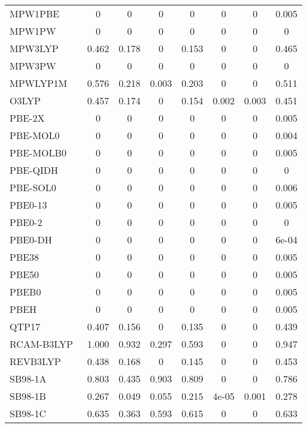 \begin{table*}
\begin{tabular}{|l|c|c|c|c|c|c|c|}
MPW1PBE~\cite{Adamo1998_664} & 0 & 0 & 0 & 0 & 0 & 0 & 0.005 \\
MPW1PW~\cite{Adamo1998_664} & 0 & 0 & 0 & 0 & 0 & 0 & 0 \\
MPW3LYP~\cite{Zhao2004_6908} & 0.462 & 0.178 & 0 & 0.153 & 0 & 0 & 0.465 \\
MPW3PW~\cite{Adamo1998_664} & 0 & 0 & 0 & 0 & 0 & 0 & 0 \\
MPWLYP1M~\cite{Schultz2005_11127} & 0.576 & 0.218 & 0.003 & 0.203 & 0 & 0 & 0.511 \\
O3LYP~\cite{Hoe2001_319,Cohen2001_607} & 0.457 & 0.174 & 0 & 0.154 & 0.002 & 0.003 & 0.451 \\
PBE-2X~\cite{Tahchieva2018_4806} & 0 & 0 & 0 & 0 & 0 & 0 & 0.005 \\
PBE-MOL0~\cite{delCampo2012_104108} & 0 & 0 & 0 & 0 & 0 & 0 & 0.004 \\
PBE-MOLB0~\cite{delCampo2012_104108} & 0 & 0 & 0 & 0 & 0 & 0 & 0.005 \\
PBE-QIDH~\cite{Bremond2014_031101} & 0 & 0 & 0 & 0 & 0 & 0 & 0 \\
PBE-SOL0~\cite{delCampo2012_104108} & 0 & 0 & 0 & 0 & 0 & 0 & 0.006 \\
PBE0-13~\cite{Cortona2012_086101} & 0 & 0 & 0 & 0 & 0 & 0 & 0.005 \\
PBE0-2~\cite{Chai2012_121} & 0 & 0 & 0 & 0 & 0 & 0 & 0 \\
PBE0-DH~\cite{Bremond2011_024106} & 0 & 0 & 0 & 0 & 0 & 0 & 6e-04 \\
PBE38~\cite{Grimme2010_154104} & 0 & 0 & 0 & 0 & 0 & 0 & 0.005 \\
PBE50~\cite{Bernard2012_204103} & 0 & 0 & 0 & 0 & 0 & 0 & 0.005 \\
PBEB0~\cite{delCampo2012_104108} & 0 & 0 & 0 & 0 & 0 & 0 & 0.005 \\
PBEH~\cite{Adamo1999_6158,Ernzerhof1999_5029} & 0 & 0 & 0 & 0 & 0 & 0 & 0.005 \\
QTP17~\cite{Jin2018_064111} & 0.407 & 0.156 & 0 & 0.135 & 0 & 0 & 0.439 \\
RCAM-B3LYP~\cite{Cohen2007_191109} & 1.000 & 0.932 & 0.297 & 0.593 & 0 & 0 & 0.947 \\
REVB3LYP~\cite{Lu2013_64} & 0.438 & 0.168 & 0 & 0.145 & 0 & 0 & 0.453 \\
SB98-1A~\cite{Schmider1998_9624} & 0.803 & 0.435 & 0.903 & 0.809 & 0 & 0 & 0.786 \\
SB98-1B~\cite{Schmider1998_9624} & 0.267 & 0.049 & 0.055 & 0.215 & 4e-05 & 0.001 & 0.278 \\
SB98-1C~\cite{Schmider1998_9624} & 0.635 & 0.363 & 0.593 & 0.615 & 0 & 0 & 0.633 \\

\end{tabular}
\end{table*}
